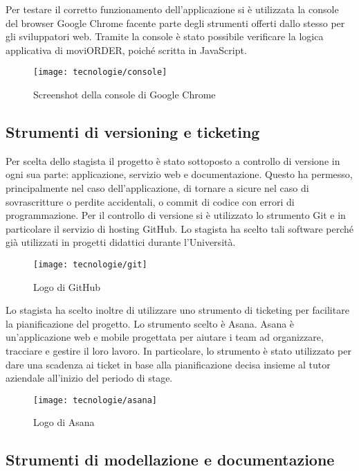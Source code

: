 Per testare il corretto funzionamento dell'applicazione si è utilizzata la console del browser Google Chrome facente parte degli strumenti offerti dallo stesso per gli sviluppatori web. Tramite la console è stato possibile verificare la logica applicativa di moviORDER, poiché scritta in JavaScript.

\begin{figure}[!h] 
    \centering 
    \texttt{[image: tecnologie/console]} 
    \caption{Screenshot della console di Google Chrome}
\end{figure}

\newpage

\subsection{Strumenti di versioning e ticketing}

Per scelta dello stagista il progetto è stato sottoposto a controllo di versione in ogni sua parte: applicazione, servizio web e documentazione. Questo ha permesso, principalmente nel caso dell'applicazione, di tornare a  sicure nel caso di sovrascritture o perdite accidentali, o commit di codice con errori di programmazione. Per il controllo di versione si è utilizzato lo strumento Git e in particolare il servizio di hosting GitHub. Lo stagista ha scelto tali software perché già utilizzati in progetti didattici durante l'Università.

\begin{figure}[!h] 
    \centering 
    \texttt{[image: tecnologie/git]} 
    \caption{Logo di GitHub}
\end{figure}

Lo stagista ha scelto inoltre di utilizzare uno strumento di ticketing per facilitare la pianificazione del progetto. Lo strumento scelto è Asana. Asana è un'applicazione web e mobile progettata per aiutare i team ad organizzare, tracciare e gestire il loro lavoro. In particolare, lo strumento è stato utilizzato per dare una scadenza ai ticket in base alla pianificazione decisa insieme al tutor aziendale all'inizio del periodo di stage.

\begin{figure}[!h] 
    \centering 
    \texttt{[image: tecnologie/asana]} 
    \caption{Logo di Asana}
\end{figure}

\subsection{Strumenti di modellazione e documentazione}


